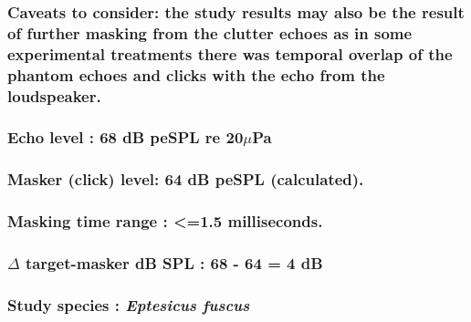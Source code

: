 \documentclass[11pt]{article}
\begin{document}
\hypertarget{caveats-to-consider-the-study-results-may-also-be-the-result-of-further-masking-from-the-clutter-echoes-as-in-some-experimental-treatments-there-was-temporal-overlap-of-the-phantom-echoes-and-clicks-with-the-echo-from-the-loudspeaker.}{%
\subsubsection{Caveats to consider: the study results may also be the
result of further masking from the clutter echoes as in some
experimental treatments there was temporal overlap of the phantom echoes
and clicks with the echo from the
loudspeaker.}\label{caveats-to-consider-the-study-results-may-also-be-the-result-of-further-masking-from-the-clutter-echoes-as-in-some-experimental-treatments-there-was-temporal-overlap-of-the-phantom-echoes-and-clicks-with-the-echo-from-the-loudspeaker.}}

\hypertarget{echo-level-68-db-pespl-re-20mupa}{%
\subsubsection{\texorpdfstring{Echo level : 68 dB peSPL re
20\(\mu\)Pa}{Echo level : 68 dB peSPL re 20\textbackslash{}muPa}}\label{echo-level-68-db-pespl-re-20mupa}}

\hypertarget{masker-click-level-64-db-pespl-calculated.}{%
\subsubsection{Masker (click) level: 64 dB peSPL
(calculated).}\label{masker-click-level-64-db-pespl-calculated.}}

\hypertarget{masking-time-range-1.5-milliseconds.}{%
\subsubsection{Masking time range : \textless{}=1.5
milliseconds.}\label{masking-time-range-1.5-milliseconds.}}

\hypertarget{delta-target-masker-db-spl-68---64-4-db}{%
\subsubsection{\texorpdfstring{\(\Delta\) target-masker dB SPL : 68 - 64
= 4
dB}{\textbackslash{}Delta target-masker dB SPL : 68 - 64 = 4 dB}}\label{delta-target-masker-db-spl-68---64-4-db}}

\hypertarget{study-species-eptesicus-fuscus}{%
\subsubsection{\texorpdfstring{Study species : \emph{Eptesicus
fuscus}}{Study species : Eptesicus fuscus}}\label{study-species-eptesicus-fuscus}}
\end{document}
